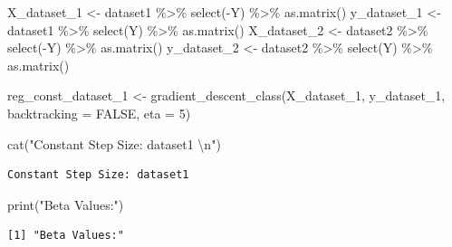 \documentclass[
  letterpaper,
  DIV=11,
  numbers=noendperiod]{scrartcl}
\newenvironment{Shaded}{\begin{snugshade}}{\end{snugshade}}
\newcommand{\AttributeTok}[1]{\textcolor[rgb]{0.40,0.45,0.13}{#1}}
\newcommand{\ConstantTok}[1]{\textcolor[rgb]{0.56,0.35,0.01}{#1}}
\newcommand{\DecValTok}[1]{\textcolor[rgb]{0.68,0.00,0.00}{#1}}
\newcommand{\FunctionTok}[1]{\textcolor[rgb]{0.28,0.35,0.67}{#1}}
\newcommand{\NormalTok}[1]{\textcolor[rgb]{0.00,0.23,0.31}{#1}}
\newcommand{\OtherTok}[1]{\textcolor[rgb]{0.00,0.23,0.31}{#1}}
\newcommand{\SpecialCharTok}[1]{\textcolor[rgb]{0.37,0.37,0.37}{#1}}
\newcommand{\StringTok}[1]{\textcolor[rgb]{0.13,0.47,0.30}{#1}}
\begin{document}
\begin{Shaded}
\begin{Highlighting}[]
\NormalTok{X\_dataset\_1 }\OtherTok{\textless{}{-}}\NormalTok{ dataset1 }\SpecialCharTok{\%\textgreater{}\%}
  \FunctionTok{select}\NormalTok{(}\SpecialCharTok{{-}}\NormalTok{Y) }\SpecialCharTok{\%\textgreater{}\%}
  \FunctionTok{as.matrix}\NormalTok{()}
\NormalTok{y\_dataset\_1 }\OtherTok{\textless{}{-}}\NormalTok{ dataset1 }\SpecialCharTok{\%\textgreater{}\%}
  \FunctionTok{select}\NormalTok{(Y) }\SpecialCharTok{\%\textgreater{}\%}
  \FunctionTok{as.matrix}\NormalTok{()}
\NormalTok{X\_dataset\_2 }\OtherTok{\textless{}{-}}\NormalTok{ dataset2 }\SpecialCharTok{\%\textgreater{}\%}
  \FunctionTok{select}\NormalTok{(}\SpecialCharTok{{-}}\NormalTok{Y) }\SpecialCharTok{\%\textgreater{}\%}
  \FunctionTok{as.matrix}\NormalTok{()}
\NormalTok{y\_dataset\_2 }\OtherTok{\textless{}{-}}\NormalTok{ dataset2 }\SpecialCharTok{\%\textgreater{}\%}
  \FunctionTok{select}\NormalTok{(Y) }\SpecialCharTok{\%\textgreater{}\%}
  \FunctionTok{as.matrix}\NormalTok{()}

\NormalTok{reg\_const\_dataset\_1 }\OtherTok{\textless{}{-}} \FunctionTok{gradient\_descent\_class}\NormalTok{(X\_dataset\_1, y\_dataset\_1, }\AttributeTok{backtracking =} \ConstantTok{FALSE}\NormalTok{, }\AttributeTok{eta =} \DecValTok{5}\NormalTok{)}

\FunctionTok{cat}\NormalTok{(}\StringTok{"Constant Step Size: dataset1 }\SpecialCharTok{\textbackslash{}n}\StringTok{"}\NormalTok{)}
\end{Highlighting}
\end{Shaded}

\begin{verbatim}
Constant Step Size: dataset1 
\end{verbatim}

\begin{Shaded}
\begin{Highlighting}[]
\FunctionTok{print}\NormalTok{(}\StringTok{"Beta Values:"}\NormalTok{)}
\end{Highlighting}
\end{Shaded}

\begin{verbatim}
[1] "Beta Values:"
\end{verbatim}

\begin{Shaded}
\end{Shaded}
\end{document}
